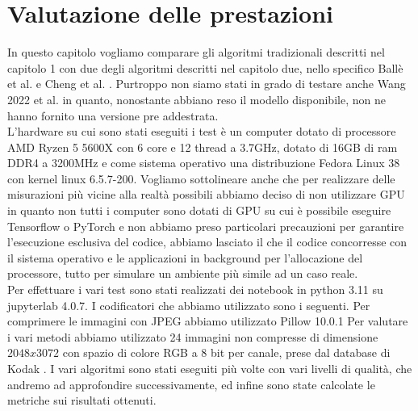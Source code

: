\chapter{Valutazione delle prestazioni}
In questo capitolo vogliamo comparare gli algoritmi tradizionali descritti nel capitolo 1 con due degli algoritmi descritti nel capitolo due, nello specifico Ballè et al. \cite{minnen2018joint} e Cheng et al. \cite{cheng2020learned}. Purtroppo non siamo stati in grado di testare anche Wang 2022 et al. \cite{wang2022neural} in quanto, nonostante abbiano reso il modello disponibile, non ne hanno fornito una versione pre addestrata.\\
L’hardware su cui sono stati eseguiti i test è un computer dotato di processore AMD Ryzen 5 5600X con 6 core e 12 thread a 3.7GHz, dotato di 16GB di ram DDR4 a 3200MHz e come sistema operativo una distribuzione Fedora Linux 38 con kernel linux 6.5.7-200. Vogliamo sottolineare anche che per realizzare delle misurazioni più vicine alla realtà possibili abbiamo deciso di non utilizzare GPU in quanto non tutti i computer sono dotati di GPU su cui è possibile eseguire Tensorflow o PyTorch e non abbiamo preso particolari precauzioni per garantire l’esecuzione esclusiva del codice, abbiamo lasciato il che il codice concorresse con il sistema operativo e le applicazioni in background per l’allocazione del processore, tutto per simulare un ambiente più simile ad un caso reale.\\
Per effettuare i vari test sono stati realizzati dei notebook in python 3.11 su jupyterlab 4.0.7. I codificatori che abbiamo utilizzato sono i seguenti. Per comprimere le immagini con JPEG abbiamo utilizzato Pillow 10.0.1 \cite{PillowLibrary} %
Per valutare i vari metodi abbiamo utilizzato 24 immagini non compresse di dimensione $2048 x 3072$ con spazio di colore RGB a 8 bit per canale, prese dal database di Kodak \cite{KodakDataset}. I vari algoritmi sono stati eseguiti più volte con vari livelli di qualità, che andremo ad approfondire successivamente, ed infine sono state calcolate le metriche sui risultati ottenuti.\\


